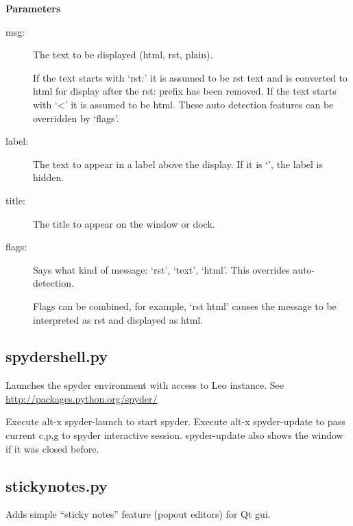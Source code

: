 \documentclass[a4paper,10pt,english]{sphinxmanual}
\begin{document}
\textbf{Parameters}
\begin{description}
\item[{msg:}] \leavevmode
The text to be displayed (html, rst, plain).

If the text starts with `rst:' it is assumed to be rst text and
is converted to html for display after the rst: prefix has been removed.
If the text starts with `\textless{}' it is assumed to be html.
These auto detection features can be overridden by `flags'.

\item[{label:}] \leavevmode
The text to appear in a label above the display. If it is `', the label is hidden.

\item[{title:}] \leavevmode
The title to appear on the window or dock.

\item[{flags:}] \leavevmode
Says what kind of message: `rst', `text', `html'. This overrides auto-detection.

Flags can be combined, for example, `rst html' causes the message to be interpreted as rst and
displayed as html.

\end{description}


\subsection{spydershell.py}
\label{plugins:spydershell-py}
Launches the spyder environment with access to Leo instance.
See \href{http://packages.python.org/spyder/}{http://packages.python.org/spyder/}

Execute alt-x spyder-launch to start spyder. Execute alt-x spyder-update to pass
current c,p,g to spyder interactive session. spyder-update also shows the window
if it was closed before.


\subsection{stickynotes.py}
\label{plugins:stickynotes-py}
Adds simple ``sticky notes'' feature (popout editors) for Qt gui.
\end{document}
